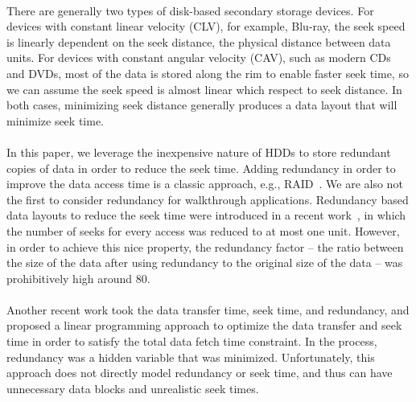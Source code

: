 \\
There are generally two types of disk-based secondary storage devices. For devices with constant linear velocity (CLV), for example, Blu-ray, the seek speed is linearly dependent on the seek distance, the physical distance between data units. For devices with constant angular velocity (CAV), such as modern CDs and DVDs, most of the data is stored along the rim to enable faster seek time, so we can assume the seek speed is almost linear which respect to seek distance. In both cases, minimizing seek distance generally produces a data layout that will minimize seek time. \\
\\
In this paper, we leverage the inexpensive nature of HDDs to store redundant
copies of data in order to reduce the seek time. Adding redundancy in order to
improve the data access time is a classic approach, e.g.,
RAID~\cite{Patterson88}.  We are also not the first to consider redundancy for
walkthrough applications.  Redundancy based data layouts to reduce the seek
time were introduced in a recent work~\cite{singleseeklayout}, in which the
number of seeks for every access was reduced to at most one unit. However, in
order to achieve this nice property, the redundancy factor -- the ratio between
the size of the data after using redundancy to the original size of the data --
was
prohibitively high around 80. \\
\\
Another recent work \cite{optimizingredundancy} took the data transfer time, seek time,
and redundancy, and proposed a linear programming approach to optimize the data
transfer and seek time in order to satisfy the total data fetch time
constraint. In the process, redundancy was a hidden variable that was
minimized. Unfortunately, this approach does not directly model redundancy or
seek time, and thus can have unnecessary data blocks and unrealistic seek
times.

